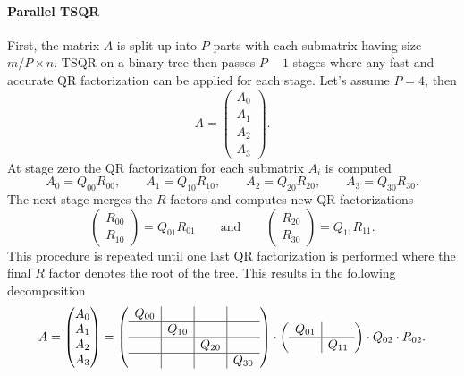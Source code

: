 \documentclass{scrartcl}
\begin{document}
\paragraph{Parallel TSQR} First, the matrix $A$ is split up into $P$ parts with each submatrix having size $m/P \times n$. TSQR on a binary tree then passes $P - 1$ stages where any fast and accurate QR factorization can be applied for each stage. Let's assume $P = 4$, then 
\begin{equation*}
A =
\begin{pmatrix}
A_0\\A_1\\A_2\\A_3
\end{pmatrix}.
\end{equation*}
At stage zero the QR factorization for each submatrix $A_i$ is computed
\begin{equation*}
A_0 = Q_{00}R_{00}, \qquad A_1 = Q_{10}R_{10}, \qquad A_2 = Q_{20}R_{20}, \qquad A_3 = Q_{30}R_{30}.
\end{equation*}
The next stage merges the $R$-factors and computes new QR-factorizations
\begin{equation*}
\begin{pmatrix}
R_{00} \\
R_{10}
\end{pmatrix} =
Q_{01}R_{01} \qquad \text{and} \qquad
\begin{pmatrix}
R_{20} \\
R_{30}
\end{pmatrix} = 
Q_{11}R_{11}.
\end{equation*}
This procedure is repeated until one last QR factorization is performed where the final $R$ factor denotes the root of the tree. This results in the following decomposition
\begin{equation} \label{eq:tsqr}
A =
\begin{pmatrix}
A_0\\A_1\\A_2\\A_3
\end{pmatrix} =
\left(
	\begin{array}{c|c|c|c}
	Q_{00} & & & \\
	\hline
	& Q_{10} & & \\
	\hline
	& & Q_{20} & \\
	\hline
	& & & Q_{30}
	\end{array}
	\right) \cdot
\left(
	\begin{array}{c|c}
		Q_{01} & \\
		\hline
		& Q_{11} 
	\end{array}
\right) \cdot
Q_{02} \cdot R_{02}.
\end{equation}
\end{document}
